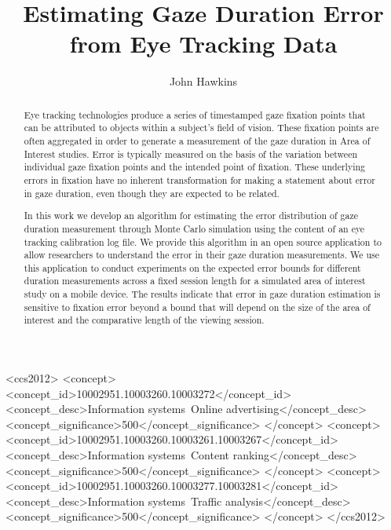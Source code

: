 \documentclass[sigconf]{acmart}
\numberwithin{equation}{section}
\begin{document}
 
\title{Estimating Gaze Duration Error from Eye Tracking Data}

\author{John Hawkins}
\renewcommand{\shortauthors}{Hawkins}

\begin{abstract}
Eye tracking technologies produce a series of timestamped gaze fixation points 
that can be attributed to objects within a subject's field of vision. 
These fixation points are often aggregated in order to generate a measurement
of the gaze duration in Area of Interest studies.
Error is typically measured on the basis of the variation between individual 
gaze fixation points and the intended point of fixation.
These underlying errors in fixation have no inherent transformation for making
a statement about error in gaze duration, even though they are expected to be
related.

In this work we develop an algorithm for estimating the error distribution of 
gaze duration measurement through Monte Carlo simulation using the content 
of an eye tracking calibration log file. 
We provide this algorithm in an open source application
to allow researchers to understand the error in their gaze duration measurements. 
We use this application to conduct experiments on the expected error bounds for 
different duration measurements across a fixed session length for a simulated 
area of interest study on a mobile device. 
The results indicate that error in gaze duration estimation is sensitive to
fixation error beyond a bound that will depend on the size of the area of interest 
and the comparative length of the viewing session.
\end{abstract}

\begin{CCSXML}
<ccs2012>
   <concept>
       <concept_id>10002951.10003260.10003272</concept_id>
       <concept_desc>Information systems~Online advertising</concept_desc>
       <concept_significance>500</concept_significance>
       </concept>
   <concept>
       <concept_id>10002951.10003260.10003261.10003267</concept_id>
       <concept_desc>Information systems~Content ranking</concept_desc>
       <concept_significance>500</concept_significance>
       </concept>
   <concept>
       <concept_id>10002951.10003260.10003277.10003281</concept_id>
       <concept_desc>Information systems~Traffic analysis</concept_desc>
       <concept_significance>500</concept_significance>
       </concept>
 </ccs2012>
\end{CCSXML}
\end{document}
